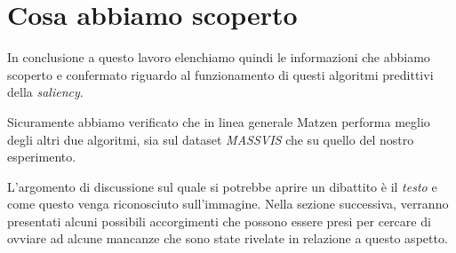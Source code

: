 \documentclass[%
	corpo=12pt,
    twoside,
    stile=classica,
    oldstyle,
    tipotesi=custom,
    greek,
    evenboxes,
]{toptesi}
\begin{document}
{\section{Cosa abbiamo scoperto}

In conclusione a questo lavoro elenchiamo quindi le informazioni che abbiamo scoperto e confermato riguardo al funzionamento di questi algoritmi predittivi della \textit{saliency}.

Sicuramente abbiamo verificato che in linea generale Matzen performa meglio degli altri due algoritmi, sia sul dataset \textit{MASSVIS} che su quello del nostro esperimento. 

L'argomento di discussione sul quale si potrebbe aprire un dibattito è il \textit{testo} e come questo venga riconosciuto sull'immagine. Nella sezione successiva, verranno presentati alcuni possibili accorgimenti che possono essere presi per cercare di ovviare ad alcune mancanze che sono state rivelate in relazione a questo aspetto. 

}
\end{document}
